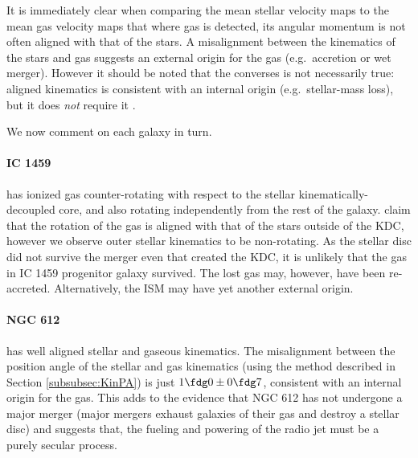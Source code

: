 \documentclass[a4paper,fleqn,usenatbib]{mnras}
\begin{document}
		It is immediately clear when comparing the mean stellar velocity maps to the mean gas velocity maps that where gas is detected, its angular momentum is not often aligned with that of the stars. A misalignment between the kinematics of the stars and gas suggests an external origin for the gas (e.g.\ accretion or wet merger). However it should be noted that the converses is not necessarily true: aligned kinematics is consistent with an internal origin (e.g.\ stellar-mass loss), but it does \emph{not} require it \citep[e.g.][]{Davis2011a}. 

		We now comment on each galaxy in turn.

		\paragraph{IC 1459} has ionized gas counter-rotating with respect to the stellar kinematically-decoupled core, and also rotating independently from the rest of the galaxy. \citet{Franx1988} claim that the rotation of the gas is aligned with that of the stars outside of the KDC, however we observe outer stellar kinematics to be non-rotating. As the stellar disc did not survive the merger even that created the KDC, it is unlikely that the gas in IC 1459 progenitor galaxy survived. The lost gas may, however, have been re-accreted. Alternatively, the ISM may have yet another external origin. 

		\paragraph{NGC 612} has well aligned stellar and gaseous kinematics. The misalignment between the position angle of the stellar and gas kinematics (using the method described in Section \ref{subsubsec:KinPA}) is just $1\fdg0\pm0\fdg7$, consistent with an internal origin for the gas. This adds to the evidence that NGC 612 has not undergone a major merger (major mergers exhaust galaxies of their gas and destroy a stellar disc) and suggests that, the fueling and powering of the radio jet must be a purely secular process. 
\end{document}
